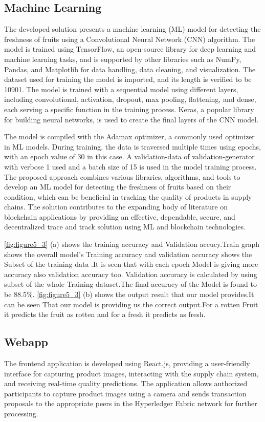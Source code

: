 \subsection{Machine Learning}
\noindent 
The developed solution presents a machine learning (ML) model for detecting the freshness of fruits using a Convolutional Neural Network (CNN) algorithm. The model is trained using TensorFlow, an open-source library for deep learning and machine learning tasks, and is supported by other libraries such as NumPy, Pandas, and Matplotlib for data handling, data cleaning, and visualization. The dataset used for training the model is imported, and its length is verified to be 10901. The model is trained with a sequential model using different layers, including convolutional, activation, dropout, max pooling, flattening, and dense, each serving a specific function in the training process. Keras, a popular library for building neural networks, is used to create the final layers of the CNN model.
\par The model is compiled with the Adamax optimizer, a commonly used optimizer in ML models. During training, the data is traversed multiple times using epochs, with an epoch value of 30 in this case. A validation-data of validation-generator with verbose 1 used and a batch size of 15 is used in the model training process. The proposed approach combines various libraries, algorithms, and tools to develop an ML model for detecting the freshness of fruits based on their condition, which can be beneficial in tracking the quality of products in supply chains. The solution contributes to the expanding body of literature on blockchain applications by providing an effective, dependable, secure, and decentralized trace and track solution using ML and blockchain technologies.

\noindent \ref{fig:figure5_3} (a) shows the training accuracy and Validation accucy.Train graph shows the overall model’s Training accuracy and validation accuracy shows the Subset of the training data .It is seen that with each epoch Model is giving more accuracy also validation accuracy too. Validation accuracy is calculated by using subset of the whole 
Training dataset.The final accuracy of the Model is found to be 88.5\%.
\ref{fig:figure5_3} (b) shows the output result that our model  provides.It can be seen That our model is providing us the correct
output.For a rotten Fruit it predicts the fruit as rotten and for a fresh it predicts as fresh.

\subsection{Webapp}

\noindent The frontend application is developed using React.js, providing a user-friendly interface for capturing product images, interacting with the supply chain system, and receiving real-time quality predictions. The application allows authorized participants to capture product images using a camera and sends transaction proposals to the appropriate peers in the Hyperledger Fabric network for further processing.

